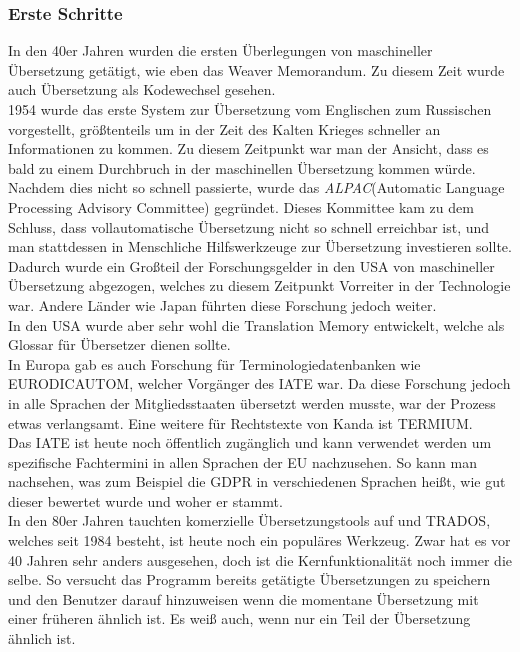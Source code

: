 \documentclass{article}
\begin{document}
	\subsubsection{Erste Schritte}
	In den 40er Jahren wurden die ersten Überlegungen von maschineller Übersetzung getätigt, wie eben das Weaver Memorandum. Zu diesem Zeit wurde auch Übersetzung als Kodewechsel gesehen.\\
	1954 wurde das erste System zur Übersetzung vom Englischen zum Russischen vorgestellt, größtenteils um in der Zeit des Kalten Krieges schneller an Informationen zu kommen. Zu diesem Zeitpunkt war man der Ansicht, dass es bald zu einem Durchbruch in der maschinellen Übersetzung kommen würde. Nachdem dies nicht so schnell passierte, wurde das \textit{ALPAC}(Automatic Language Processing Advisory Committee) gegründet. Dieses Kommittee kam zu dem Schluss, dass vollautomatische Übersetzung nicht so schnell erreichbar ist, und man stattdessen in Menschliche Hilfswerkzeuge zur Übersetzung investieren sollte. Dadurch wurde ein Großteil der Forschungsgelder in den USA von maschineller Übersetzung abgezogen, welches zu diesem Zeitpunkt Vorreiter in der Technologie war. Andere Länder wie Japan führten diese Forschung jedoch weiter. \\
	In den USA wurde aber sehr wohl die Translation Memory entwickelt, welche als Glossar für Übersetzer dienen sollte. \\
	In Europa gab es auch Forschung für Terminologiedatenbanken wie EURODICAUTOM, welcher Vorgänger des IATE war. Da diese Forschung jedoch in alle Sprachen der Mitgliedsstaaten übersetzt werden musste, war der Prozess etwas verlangsamt. Eine weitere für Rechtstexte von Kanda ist TERMIUM. \\
	Das IATE ist heute noch öffentlich zugänglich und kann verwendet werden um spezifische Fachtermini in allen Sprachen der EU nachzusehen. So kann man nachsehen, was zum Beispiel die GDPR in verschiedenen Sprachen heißt, wie gut dieser bewertet wurde und woher er stammt. \\
	In den 80er Jahren tauchten komerzielle Übersetzungstools auf und TRADOS, welches seit 1984 besteht, ist heute noch ein populäres Werkzeug. Zwar hat es vor 40 Jahren sehr anders ausgesehen, doch ist die Kernfunktionalität noch immer die selbe. So versucht das Programm bereits getätigte Übersetzungen zu speichern und den Benutzer darauf hinzuweisen wenn die momentane Übersetzung mit einer früheren ähnlich ist. Es weiß auch, wenn nur ein Teil der Übersetzung ähnlich ist. \\
\end{document}
